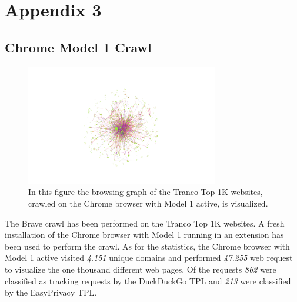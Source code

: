 
\chapter{Appendix 3}
\section{Chrome Model 1 Crawl}
\begin{figure}[ht!]
\begin{center}
\includegraphics[width=0.75\textwidth]{images/original.png}
\end{center}
\caption{In this figure the browsing graph of the Tranco Top 1K websites, crawled on the Chrome browser with Model 1 active, is visualized. }
\end{figure}
The Brave crawl has been performed on the Tranco Top 1K websites. A fresh installation of the Chrome browser with Model 1 running in an extension has been used to perform
the crawl. As for the statistics, the Chrome browser with Model 1 active visited \emph{4.151} unique domains and performed \emph{47.255} web request to 
visualize the one thousand different web pages. Of the requests \emph{862} were classified as tracking requests by the DuckDuckGo 
TPL and \emph{213} were classified by the EasyPrivacy TPL.

